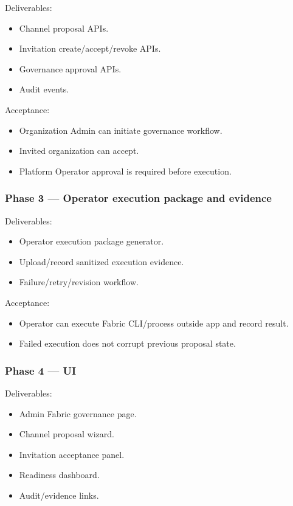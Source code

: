 Deliverables:

\begin{itemize}
  \item Channel proposal APIs.
  \item Invitation create/accept/revoke APIs.
  \item Governance approval APIs.
  \item Audit events.
\end{itemize}

Acceptance:

\begin{itemize}
  \item Organization Admin can initiate governance workflow.
  \item Invited organization can accept.
  \item Platform Operator approval is required before execution.
\end{itemize}

\subsubsection{Phase 3 --- Operator execution package and evidence}

Deliverables:

\begin{itemize}
  \item Operator execution package generator.
  \item Upload/record sanitized execution evidence.
  \item Failure/retry/revision workflow.
\end{itemize}

Acceptance:

\begin{itemize}
  \item Operator can execute Fabric CLI/process outside app and record result.
  \item Failed execution does not corrupt previous proposal state.
\end{itemize}

\subsubsection{Phase 4 --- UI}

Deliverables:

\begin{itemize}
  \item Admin Fabric governance page.
  \item Channel proposal wizard.
  \item Invitation acceptance panel.
  \item Readiness dashboard.
  \item Audit/evidence links.
\end{itemize}

